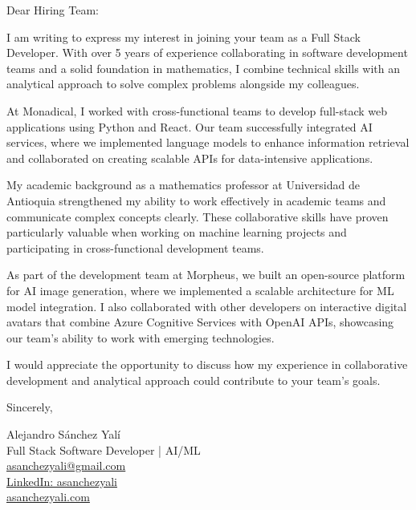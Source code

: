 \documentclass[11pt]{letter}
\begin{document}
\begin{letter}{}

\opening{Dear Hiring Team:}

I am writing to express my interest in joining your team as a Full Stack Developer. With over 5 years of experience collaborating in software development teams and a solid foundation in mathematics, I combine technical skills with an analytical approach to solve complex problems alongside my colleagues.

At Monadical, I worked with cross-functional teams to develop full-stack web applications using Python and React. Our team successfully integrated AI services, where we implemented language models to enhance information retrieval and collaborated on creating scalable APIs for data-intensive applications.

My academic background as a mathematics professor at Universidad de Antioquia strengthened my ability to work effectively in academic teams and communicate complex concepts clearly. These collaborative skills have proven particularly valuable when working on machine learning projects and participating in cross-functional development teams.

As part of the development team at Morpheus, we built an open-source platform for AI image generation, where we implemented a scalable architecture for ML model integration. I also collaborated with other developers on interactive digital avatars that combine Azure Cognitive Services with OpenAI APIs, showcasing our team's ability to work with emerging technologies.

I would appreciate the opportunity to discuss how my experience in collaborative development and analytical approach could contribute to your team's goals.

\closing{Sincerely,}

\vspace{12pt}
Alejandro Sánchez Yalí\\
Full Stack Software Developer | AI/ML\\
\href{mailto:asanchezyali@gmail.com}{asanchezyali@gmail.com}\\
\href{https://www.linkedin.com/in/asanchezyali}{LinkedIn: asanchezyali}\\
\href{https://asanchezyali.com}{asanchezyali.com}

\end{letter}
\end{document}

